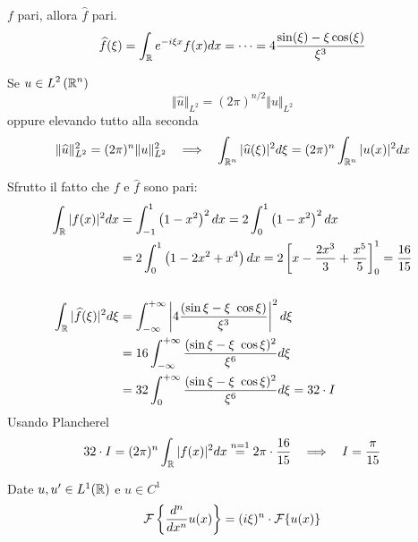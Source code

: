 $f$ pari, allora $\hat{f}$ pari.
\begin{equation*}
\widehat{f}(\xi) = \int_{\mathbb{R}} e^{- i\xi x} f(x) dx = \cdots = 4\frac{\sin(\xi) - \xi \cos(\xi)}{\xi^{3}}
\end{equation*}
\begin{thm}
 Se $\displaystyle u\in L^{2}\left(\mathbb{R}^{n}\right)$
\begin{equation*}
\Vert \hat{u}\Vert_{L^{2}} = (2\pi)^{n/2}\Vert u\Vert_{L^{2}}
\end{equation*}
oppure elevando tutto alla seconda
\begin{equation*}
\Vert \hat{u}\Vert^{2}_{L^{2}} = (2\pi)^{n}\Vert u\Vert^{2}_{L^{2}} \ \ \implies \ \ \int_{\RR^{n}}| \hat{u}(\xi)|^{2} d\xi = (2\pi)^{n}\int_{\RR^{n}}| u(x)|^{2} dx
\end{equation*}
\end{thm}
Sfrutto il fatto che $f$ e $\hat{f}$ sono pari:
\begin{align*}
\int_{\mathbb{R}}| f(x)|^{2} dx & = \int^{1}_{- 1}\left(1 - x^{2}\right)^{2} dx = 2\int^{1}_{0}\left(1 - x^{2}\right)^{2} dx\\
 & = 2\int^{1}_{0}\left(1 - 2x^2 + x^{4}\right) dx = 2\left[ x - \frac{2x^{3}}{3} + \frac{x^{5}}{5}\right]^{1}_{0} = \frac{16}{15}\\
 & \\
\int_{\mathbb{R}}| \widehat{f}(\xi)|^{2} d\xi  & = \int^{+ \infty}_{- \infty}\left| 4\frac{(\sin \xi - \xi \ \cos \xi)}{\xi^{3}}\right|^{2} d\xi \\
 & = 16\int^{+ \infty}_{- \infty}\frac{(\sin \xi - \xi \ \cos \xi)^{2}}{\xi^{6}} d\xi \\
 & = 32\int^{+ \infty}_{0}\frac{(\sin \xi - \xi \ \cos \xi)^{2}}{\xi^{6}} d\xi = 32 \cdot I
\end{align*}
Usando Plancherel
\begin{equation*}
32 \cdot I = (2\pi)^{n}\int_{\mathbb{R}}| f(x)|^{2} dx\overset{n = 1}{=} 2\pi \cdot \frac{16}{15} \ \ \implies \ \ I = \frac{\pi}{15}
\end{equation*}
\Soluzione
\begin{thm}
 Date $u, u'\in L^{1}(\mathbb{R})$ e $u\in C^{1}$
\begin{equation*}
\mathcal{F} \left\{\frac{d^{n}}{dx^{n}} u(x)\right\} = (i\xi)^{n} \cdot \mathcal{F} \{u(x)\}
\end{equation*}
\end{thm}
